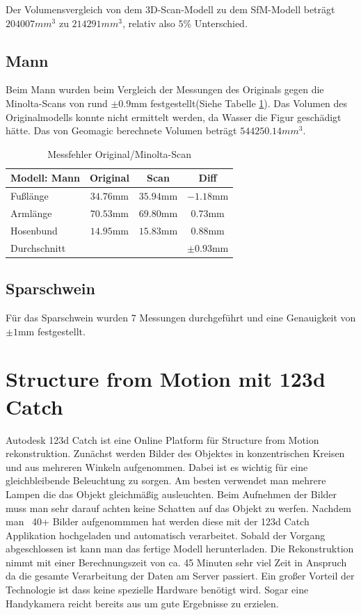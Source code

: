 \documentclass[]{article}
\begin{document}
Der Volumensvergleich von dem 3D-Scan-Modell zu dem SfM-Modell beträgt $204007 mm^3$ zu $214291 mm^3$, relativ also $5 \%$ Unterschied. 

\subsection{Mann}
Beim Mann wurden beim Vergleich der Messungen des Originals gegen die Minolta-Scans von rund $\pm 0.9$mm festgestellt(Siehe Tabelle \ref{tab:man:errorScan}). Das Volumen des Originalmodells konnte nicht ermittelt werden, da Wasser die Figur geschädigt hätte. Das von Geomagic berechnete Volumen beträgt $544250.14mm^3$.

\begin{table}[h!]
\centering
\begin{tabular}{l | c c | c}
Modell: Mann& Original & Scan & Diff\\
\hline
Fußlänge & $34.76$mm & $35.94$mm & $-1.18$mm\\
Armlänge & $70.53$mm & $69.80$mm & $0.73$mm\\
Hosenbund & $14.95$mm & $15.83$mm & $0.88$mm\\
\hline \hline
Durchschnitt & & & $\pm 0.93$mm
\end{tabular}
\caption{Messfehler Original/Minolta-Scan}
\label{tab:man:errorScan}
\end{table}

\subsection{Sparschwein}
Für das Sparschwein wurden 7 Messungen durchgeführt und eine Genauigkeit von $\pm 1$mm festgestellt.

\section{Structure from Motion mit 123d Catch} %

Autodesk 123d Catch ist eine Online Platform für Structure from Motion rekonstruktion. Zunächst werden Bilder des Objektes in konzentrischen Kreisen und aus mehreren Winkeln aufgenommen. Dabei ist es wichtig für eine gleichbleibende Beleuchtung zu sorgen. Am besten verwendet man mehrere Lampen die das Objekt gleichmäßig ausleuchten. Beim Aufnehmen der Bilder muss man sehr darauf achten keine Schatten auf das Objekt zu werfen. Nachdem man ~40+ Bilder aufgenommmen hat werden diese mit der 123d Catch Applikation hochgeladen und automatisch verarbeitet. Sobald der Vorgang abgeschlossen ist kann man das fertige Modell herunterladen. Die Rekonstruktion nimmt mit einer Berechnungszeit von ca. 45 Minuten sehr viel Zeit in Anspruch da die gesamte Verarbeitung der Daten am Server passiert. Ein großer Vorteil der Technologie ist dass keine spezielle Hardware benötigt wird. Sogar eine Handykamera reicht bereits aus um gute Ergebnisse zu erzielen.
\end{document}
